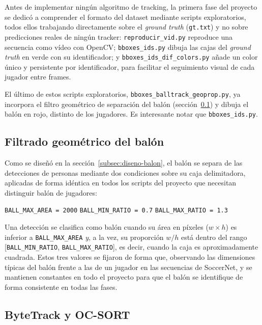Antes de implementar ningún algoritmo de tracking, la primera fase del
proyecto se dedicó a comprender el
formato del dataset mediante scripts exploratorios, todos
ellos trabajando directamente sobre el \emph{ground truth}
(\texttt{gt.txt}) y no sobre predicciones reales de ningún tracker:
\texttt{reproducir\_vid.py} reproduce una secuencia como vídeo con OpenCV;
\texttt{bboxes\_ids.py} dibuja las cajas del \emph{ground truth} en verde
con su identificador; y \texttt{bboxes\_ids\_dif\_colors.py}
añade un color único y persistente por identificador, para facilitar el
seguimiento visual de cada jugador entre frames.

El último de estos scripts exploratorios,
\texttt{bboxes\_balltrack\_geoprop.py}, ya incorpora el filtro geométrico
de separación del balón (sección~\ref{subsec:impl-balon}) y dibuja el balón
en rojo, distinto de los jugadores. Es interesante notar que
\texttt{bboxes\_ids.py}.

\subsection{Filtrado geométrico del balón}
\label{subsec:impl-balon}

Como se diseñó en la sección~\ref{subsec:diseno-balon}, el balón se separa
de las detecciones de personas mediante dos condiciones sobre su caja
delimitadora, aplicadas de forma idéntica en todos los scripts del
proyecto que necesitan distinguir balón de jugadores:

\begin{center}
\texttt{BALL\_MAX\_AREA = 2000} \quad
\texttt{BALL\_MIN\_RATIO = 0.7} \quad
\texttt{BALL\_MAX\_RATIO = 1.3}
\end{center}

Una detección se clasifica como balón cuando su área en píxeles
($w \times h$) es inferior a \texttt{BALL\_MAX\_AREA} \emph{y}, a la vez, su
proporción $w/h$ está dentro del rango
[\texttt{BALL\_MIN\_RATIO}, \texttt{BALL\_MAX\_RATIO}], es decir, cuando la
caja es aproximadamente cuadrada. Estos tres valores se fijaron de forma
que, observando las dimensiones típicas del balón frente a las de un
jugador en las secuencias de SoccerNet, y se mantienen constantes en todo
el proyecto para que el balón se identifique de forma consistente en todas
las fases.

\subsection{ByteTrack y OC-SORT}
\label{subsec:impl-algoritmos}

